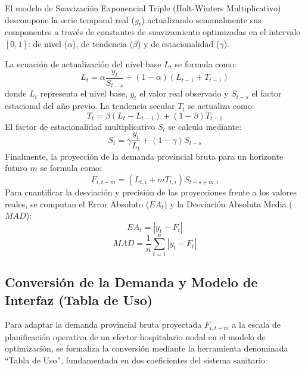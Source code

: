 \documentclass[conference]{IEEEtran}
\begin{document}
El modelo de Suavización Exponencial Triple (Holt-Winters Multiplicativo) descompone la serie temporal real ($y_t$) actualizando semanalmente sus componentes a través de constantes de suavizamiento optimizadas en el intervalo $[0,1]$: de nivel ($\alpha$), de tendencia ($\beta$) y de estacionalidad ($\gamma$).

La ecuación de actualización del nivel base $L_t$ se formula como:
\begin{equation}
    L_t = \alpha \frac{y_t}{S_{t-s}} + (1 - \alpha) (L_{t-1} + T_{t-1})
\end{equation}
donde $L_t$ representa el nivel base, $y_t$ el valor real observado y $S_{t-s}$ el factor estacional del año previo. La tendencia secular $T_t$ se actualiza como:
\begin{equation}
    T_t = \beta (L_t - L_{t-1}) + (1 - \beta) T_{t-1}
\end{equation}
El factor de estacionalidad multiplicativo $S_t$ se calcula mediante:
\begin{equation}
    S_t = \gamma \frac{y_t}{L_t} + (1 - \gamma) S_{t-s}
\end{equation}
Finalmente, la proyección de la demanda provincial bruta para un horizonte futuro $m$ se formula como:
\begin{equation}
    F_{i,t+m} = (L_{t,i} + m T_{t,i}) S_{t-s+m,i}
\end{equation}
Para cuantificar la desviación y precisión de las proyecciones frente a los valores reales, se computan el Error Absoluto ($EA_t$) y la Desviación Absoluta Media ($MAD$):
\begin{equation}
    EA_t = |y_t - F_t|
\end{equation}
\begin{equation}
    MAD = \frac{1}{n} \sum_{t=1}^{n} |y_t - F_t|
\end{equation}

\subsection{Conversión de la Demanda y Modelo de Interfaz (Tabla de Uso)}
Para adaptar la demanda provincial bruta proyectada $F_{i,t+m}$ a la escala de planificación operativa de un efector hospitalario nodal en el modelo de optimización, se formaliza la conversión mediante la herramienta denominada ``Tabla de Uso'', fundamentada en dos coeficientes del sistema sanitario:
\end{document}
